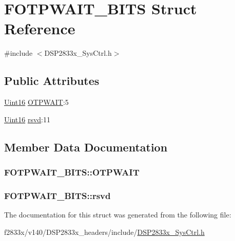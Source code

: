 \hypertarget{struct_f_o_t_p_w_a_i_t___b_i_t_s}{}\section{F\+O\+T\+P\+W\+A\+I\+T\+\_\+\+B\+I\+T\+S Struct Reference}
\label{struct_f_o_t_p_w_a_i_t___b_i_t_s}


{\ttfamily \#include $<$D\+S\+P2833x\+\_\+\+Sys\+Ctrl.\+h$>$}

\subsection*{Public Attributes}
\begin{DoxyCompactItemize}
\item 
\hyperlink{_d_s_p2833x___device_8h_a59a9f6be4562c327cbfb4f7e8e18f08b}{Uint16} \hyperlink{struct_f_o_t_p_w_a_i_t___b_i_t_s_ae771a262cbcef7cd6697640e938c1c44}{O\+T\+P\+W\+A\+I\+T}\+:5
\item 
\hyperlink{_d_s_p2833x___device_8h_a59a9f6be4562c327cbfb4f7e8e18f08b}{Uint16} \hyperlink{struct_f_o_t_p_w_a_i_t___b_i_t_s_af83512e965409fdf9a6eb167f9798d38}{rsvd}\+:11
\end{DoxyCompactItemize}


\subsection{Member Data Documentation}
\hypertarget{struct_f_o_t_p_w_a_i_t___b_i_t_s_ae771a262cbcef7cd6697640e938c1c44}{}
\subsubsection[{O\+T\+P\+W\+A\+I\+T}]{ F\+O\+T\+P\+W\+A\+I\+T\+\_\+\+B\+I\+T\+S\+::\+O\+T\+P\+W\+A\+I\+T}\label{struct_f_o_t_p_w_a_i_t___b_i_t_s_ae771a262cbcef7cd6697640e938c1c44}
\hypertarget{struct_f_o_t_p_w_a_i_t___b_i_t_s_af83512e965409fdf9a6eb167f9798d38}{}
\subsubsection[{rsvd}]{ F\+O\+T\+P\+W\+A\+I\+T\+\_\+\+B\+I\+T\+S\+::rsvd}\label{struct_f_o_t_p_w_a_i_t___b_i_t_s_af83512e965409fdf9a6eb167f9798d38}


The documentation for this struct was generated from the following file\+:\begin{DoxyCompactItemize}
\item 
f2833x/v140/\+D\+S\+P2833x\+\_\+headers/include/\hyperlink{_d_s_p2833x___sys_ctrl_8h}{D\+S\+P2833x\+\_\+\+Sys\+Ctrl.\+h}\end{DoxyCompactItemize}
